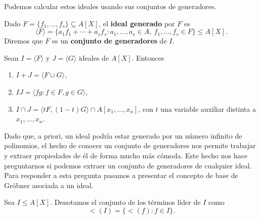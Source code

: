Podemos calcular estos ideales usando sus conjuntos de generadores.
\begin{definicion}
    Dado $F=\{f_1,\dots, f_s\}\subseteq A[X]$, el \textbf{ideal generado} por $F$ es
    \begin{equation*}
        \langle F \rangle = \{a_1f_1 + \cdots + a_sf_s : a_1,\dots, a_s\in A,\ f_1,\dots, f_s\in F\}\le A[X].
    \end{equation*}
    Diremos que $F$ es un \textbf{conjunto de generadores} de $I$.
\end{definicion}

\begin{proposicion}
    Sean $I=\langle F\rangle$ y $J=\langle G\rangle$ ideales de $A[X]$. Entonces
    \begin{enumerate}
        \item $I+J = \langle F\cup G\rangle$,
        \item $IJ = \langle fg : f\in F, g\in G \rangle$,
        \item $I\cap J = \langle tF, (1-t)G \rangle \cap A[x_1,\dots, x_n]$, con $t$ una variable auxiliar distinta a $x_1,\dots, x_n$.
    \end{enumerate}
\end{proposicion}
Dado que, a priori, un ideal podría estar generado por un número infinito de polinomios, el hecho de conocer un conjunto de generadores nos permite trabajar y extraer propiedades de él de forma mucho más cómoda. Este hecho nos hace preguntarnos si podemos extraer un conjunto de generadores de cualquier ideal. Para responder a esta pregunta pasamos a presentar el concepto de base de Gröbner asociada a un ideal.
\begin{definicion}
    Sea $I\le A[X]$. Denotamos el conjunto de los términos líder de $I$ como
    \begin{equation*}
        \lt(I) = \{\lt(f) : f\in I\}.
    \end{equation*}
\end{definicion}

